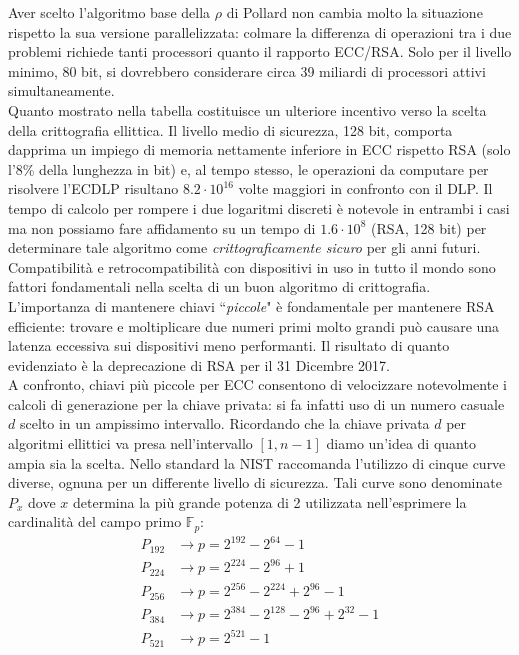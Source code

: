 \documentclass[a4paper,12pt]{tesiinfo}
\begin{document}
Aver scelto l'algoritmo base della $\rho$ di Pollard non cambia molto la situazione rispetto la sua versione parallelizzata: colmare la differenza di operazioni tra i due problemi richiede tanti processori quanto il rapporto ECC/RSA. Solo per il livello minimo, 80 bit, si dovrebbero considerare circa 39 miliardi di processori attivi simultaneamente. 
\\
Quanto mostrato nella tabella costituisce un ulteriore incentivo verso la scelta della crittografia ellittica. Il livello medio di sicurezza, 128 bit, comporta dapprima un impiego di memoria nettamente inferiore in ECC rispetto RSA (solo l'8\% della lunghezza in bit) e, al tempo stesso, le operazioni da computare per risolvere l'ECDLP risultano $8.2 \cdot 10^{16}$ volte maggiori in confronto con il DLP. Il tempo di calcolo per rompere i due logaritmi discreti \`e notevole in entrambi i casi ma non possiamo fare affidamento su un tempo di $1.6 \cdot 10^{8}$ (RSA, 128 bit) per determinare tale algoritmo come \textit{crittograficamente sicuro} per gli anni futuri. Compatibilit\`a e retrocompatibilit\`a con dispositivi in uso in tutto il mondo sono fattori fondamentali nella scelta di un buon algoritmo di crittografia. L'importanza di mantenere chiavi ``\textit{piccole}" \`e fondamentale per mantenere RSA efficiente: trovare e moltiplicare due numeri primi molto grandi pu\`o causare una latenza eccessiva sui dispositivi meno performanti. Il risultato di quanto evidenziato \`e la deprecazione di RSA \cite{NIST key lenght} per il 31 Dicembre 2017.
\\
A confronto, chiavi pi\`u piccole per ECC consentono di velocizzare notevolmente i calcoli di generazione per la chiave privata: si fa infatti uso di un numero casuale $d$ scelto in un ampissimo intervallo. Ricordando che la chiave privata $d$ per algoritmi ellittici va presa nell'intervallo $[1, n-1]$ diamo un'idea di quanto ampia sia la scelta. Nello standard \cite{dss} la NIST raccomanda l'utilizzo di cinque curve diverse, ognuna per un differente livello di sicurezza. Tali curve sono denominate $P_{x}$ dove $x$ determina la pi\`u grande potenza di 2 utilizzata nell'esprimere la cardinalit\`a del campo primo $\mathbb{F}_p$:
\begin{align*}
 P_{192} &\to p=2^{192} - 2^{64}-1\\
 P_{224} &\to p=2^{224} - 2^{96}+1\\
 P_{256} &\to p=2^{256} - 2^{224}+ 2^{96}-1\\
 P_{384} &\to p=2^{384} - 2^{128}-2^{96}+2^{32}-1\\
 P_{521} &\to p=2^{521} -1
\end{align*}
\end{document}
